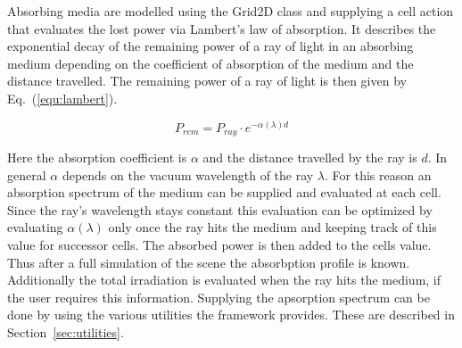 \documentclass[a4paper,10pt]{article}
\newcommand{\equref}[1]{Eq.~(\ref{#1})}
\newcommand{\secref}[1]{Section~\ref{#1}}
\begin{document}
    Absorbing media are modelled using the Grid2D class and
    supplying a cell action that evaluates the lost power via
    Lambert's law of absorption.
    It describes the exponential decay of the remaining power
    of a ray of light in an absorbing medium depending on
    the coefficient of absorption of the medium and the 
    distance travelled.
    The remaining power of a ray of light is then given by
    \equref{equ:lambert}.

    \begin{equation}
    \label{equ:lambert}
        P_{rem} = P_{ray} \cdot e^{-\alpha(\lambda) d}
    \end{equation}

    Here the absorption coefficient is $\alpha$ and the distance
    travelled by the ray is $d$. 
    In general $\alpha$ depends on the vacuum wavelength of the ray
    $\lambda$.
    For this reason an absorption spectrum of the medium can be supplied
    and evaluated at each cell.
    Since the ray's wavelength stays constant this evaluation can be
    optimized by evaluating $\alpha(\lambda)$ only once the ray hits the
    medium and keeping track of this value for successor cells.
    The absorbed power is then added to the cells value.
    Thus after a full simulation of the scene the absorbption profile
    is known.
    Additionally the total irradiation is evaluated when the ray hits
    the medium, if the user requires this information.
    Supplying the apsorption spectrum can be done by using the various
    utilities the framework provides.
    These are described in \secref{sec:utilities}.
\end{document}
